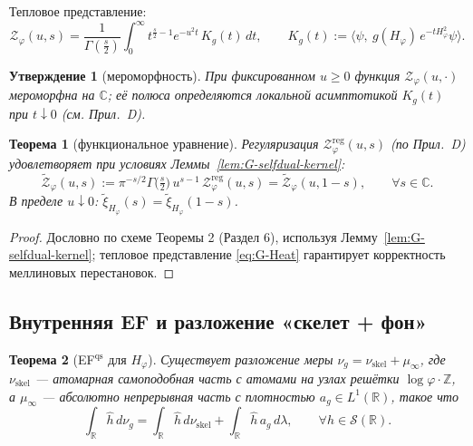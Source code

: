 \documentclass{article}
\numberwithin{equation}{section}
\theoremstyle{plain}
\newtheorem{theorem}{Теорема}
\newtheorem{proposition}{Утверждение}
\theoremstyle{definition}
\theoremstyle{remark}
\def\infty{∞}\def\partial{∂}\def\sum{Σ}\def\int{∫}%
\def\cdot{·}\def\times{×}\def\pm{±}\def\mp{∓}\def\approx{≈}%
\begin{document}
Тепловое представление:
\begin{equation}\label{eq:G-Heat}
\mathcal Z_\varphi(u,s)
=\frac{1}{\Gamma(\tfrac s2)}\int_0^\infty t^{\frac s2-1}e^{-u^2 t}\,K_g(t)\,dt,\qquad 
K_g(t):=\big\langle \psi,\ g(H_\varphi)\,e^{-tH_\varphi^2}\psi\big\rangle.
\end{equation}

\begin{proposition}[мероморфность]\label{prop:G-meromorphic}
При фиксированном \(u\ge0\) функция \(\mathcal Z_\varphi(u,\cdot)\) мероморфна на \(\mathbb C\); её полюса определяются локальной асимптотикой \(K_g(t)\) при \(t\downarrow0\) (см. Прил.~\textup{D}).
\end{proposition}

\begin{theorem}[функциональное уравнение]\label{thm:G-FE}
Регуляризация \(\mathcal Z_\varphi^{\mathrm{reg}}(u,s)\) (по Прил.~\textup{D}) удовлетворяет при условиях Леммы~\ref{lem:G-selfdual-kernel}:
\begin{equation}\label{eq:G-FE}
\widetilde{\mathcal Z}_\varphi(u,s)
:=\pi^{-s/2}\Gamma\!\big(\tfrac s2\big)\,u^{s-1}\,\mathcal Z_\varphi^{\mathrm{reg}}(u,s)
=\widetilde{\mathcal Z}_\varphi(u,1-s),\qquad \forall s\in\mathbb C.
\end{equation}
В пределе \(u\downarrow0\): \(\widetilde{\xi}_{H_\varphi}(s)=\widetilde{\xi}_{H_\varphi}(1-s)\).
\end{theorem}

\begin{proof}
Дословно по схеме Теоремы 2 (Раздел 6), используя Лемму~\ref{lem:G-selfdual-kernel}; тепловое представление \eqref{eq:G-Heat} гарантирует корректность меллиновых перестановок.
\end{proof}

\subsection*{Внутренняя EF и разложение «скелет + фон»}

\begin{theorem}[EF$^{\mathrm{qs}}$ для \(H_\varphi\)]\label{thm:G-EF}
Существует разложение меры \(\nu_g=\nu_{\mathrm{skel}}+\mu_\infty\), где \(\nu_{\mathrm{skel}}\) — атомарная самоподобная часть с атомами на узлах решётки \(\log\varphi\cdot\mathbb Z\), а \(\mu_\infty\) — абсолютно непрерывная часть с плотностью \(a_g\in L^1(\mathbb R)\), такое что
\begin{equation}\label{eq:G-EF-func}
\int_{\mathbb R}\widehat h\,d\nu_g
=\int_{\mathbb R}\widehat h\,d\nu_{\mathrm{skel}}
+\int_{\mathbb R}\widehat h\,a_g\,d\lambda,\qquad \forall h\in\mathcal S(\mathbb R).
\end{equation}
\end{theorem}
\end{document}
